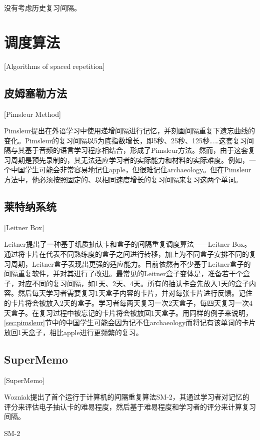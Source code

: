 没有考虑历史复习间隔。

\section{调度算法}[Algorithms of spaced repetition]

\subsection{皮姆塞勒方法}[Pimsleur Method]\label{sec:pimsleur}

Pimsleur提出在外语学习中使用递增间隔进行记忆，并刻画间隔重复下遗忘曲线的变化\cite{pimsleurMemorySchedule1967}。Pimsleur的复习间隔以5为底指数增长，即5秒、25秒、125秒……这套复习间隔与其基于音频的语言学习程序相结合，形成了Pimsleur方法。然而，由于这套复习周期是预先录制的，其无法适应学习者的实际能力和材料的实际难度。例如，一个中国学生可能会非常容易地记住apple，但很难记住archaeology。但在Pimsleur方法中，他必须按照固定的、以相同速度增长的复习间隔来复习这两个单词。

\subsection{莱特纳系统}[Leitner Box]

Leitner提出了一种基于纸质抽认卡和盒子的间隔重复调度算法——Leitner Box\cite{leitnerLerntManLeben1974}。通过将卡片在代表不同熟练度的盒子之间进行转移，加上为不同盒子安排不同的复习周期，Leitner盒子表现出更强的适应能力。目前依然有不少基于Leitner盒子的间隔重复软件，并对其进行了改进。最常见的Leitner盒子变体是，准备若干个盒子，对应不同的复习间隔，如1天、2天、4天。所有的抽认卡会先放入1天的盒子内容。然后每天学习者需要复习1天盒子内容的卡片，并对每张卡片进行反馈。记住的卡片将会被放入2天的盒子。学习者每两天复习一次2天盒子，每四天复习一次4天盒子。在复习过程中被忘记的卡片将会被放回1天盒子。用同样的例子来说明，\ref{sec:pimsleur}节中的中国学生可能会因为记不住archaeology而将记有该单词的卡片放回1天盒子，相比apple进行更频繁的复习。

\subsection{SuperMemo}[SuperMemo]

Wozniak提出了首个运行于计算机的间隔重复算法SM-2\cite{wozniakOptimizationLearning1990}，其通过学习者对记忆的评分来评估电子抽认卡的难易程度，然后基于难易程度和学习者的评分来计算复习间隔。

\begin{algorithm}[htbp]
    \DontPrintSemicolon
    \caption{SM-2}
    \label{alg:sm-2}
\end{algorithm}

